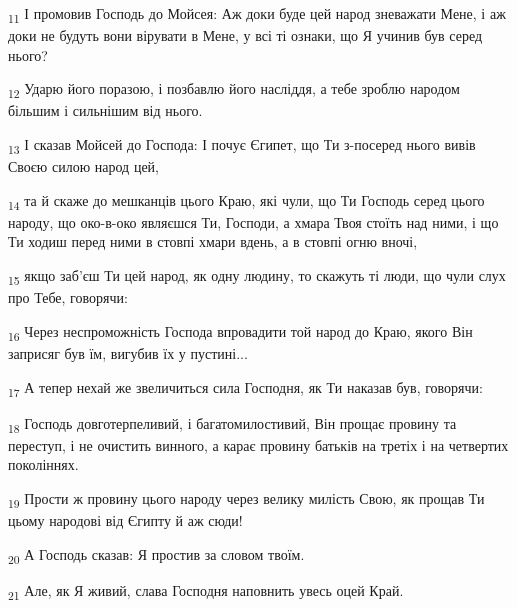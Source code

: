 \begin{tcolorbox}
\textsubscript{11} І промовив Господь до Мойсея: Аж доки буде цей народ зневажати Мене, і аж доки не будуть вони вірувати в Мене, у всі ті ознаки, що Я учинив був серед нього?
\end{tcolorbox}
\begin{tcolorbox}
\textsubscript{12} Ударю його поразою, і позбавлю його насліддя, а тебе зроблю народом більшим і сильнішим від нього.
\end{tcolorbox}
\begin{tcolorbox}
\textsubscript{13} І сказав Мойсей до Господа: І почує Єгипет, що Ти з-посеред нього вивів Своєю силою народ цей,
\end{tcolorbox}
\begin{tcolorbox}
\textsubscript{14} та й скаже до мешканців цього Краю, які чули, що Ти Господь серед цього народу, що око-в-око являєшся Ти, Господи, а хмара Твоя стоїть над ними, і що Ти ходиш перед ними в стовпі хмари вдень, а в стовпі огню вночі,
\end{tcolorbox}
\begin{tcolorbox}
\textsubscript{15} якщо заб'єш Ти цей народ, як одну людину, то скажуть ті люди, що чули слух про Тебе, говорячи:
\end{tcolorbox}
\begin{tcolorbox}
\textsubscript{16} Через неспроможність Господа впровадити той народ до Краю, якого Він заприсяг був їм, вигубив їх у пустині...
\end{tcolorbox}
\begin{tcolorbox}
\textsubscript{17} А тепер нехай же звеличиться сила Господня, як Ти наказав був, говорячи:
\end{tcolorbox}
\begin{tcolorbox}
\textsubscript{18} Господь довготерпеливий, і багатомилостивий, Він прощає провину та переступ, і не очистить винного, а карає провину батьків на третіх і на четвертих поколіннях.
\end{tcolorbox}
\begin{tcolorbox}
\textsubscript{19} Прости ж провину цього народу через велику милість Свою, як прощав Ти цьому народові від Єгипту й аж сюди!
\end{tcolorbox}
\begin{tcolorbox}
\textsubscript{20} А Господь сказав: Я простив за словом твоїм.
\end{tcolorbox}
\begin{tcolorbox}
\textsubscript{21} Але, як Я живий, слава Господня наповнить увесь оцей Край.
\end{tcolorbox}

